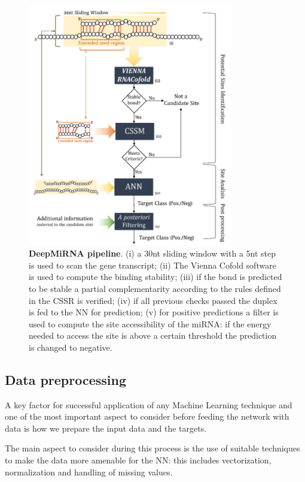 \begin{figure}[hbt!]
	\centering
	\includegraphics[width=0.8\textwidth]{Figures/pipeline}
	\caption{\textbf{DeepMiRNA pipeline}. (i) a 30nt sliding window with a 5nt step is used to scan the gene transcript; (ii) The Vienna Cofold software is used to compute the binding stability; (iii) if the bond is predicted to be stable a partial complementarity according to the rules defined in the CSSR is verified; (iv) if all previous checks passed the duplex is fed to the NN for prediction; (v) for positive predictions a filter is used to compute the site accessibility of the miRNA: if the energy needed to access the site is above a certain threshold the prediction is changed to negative.}
	\label{fig:pipeline}
\end{figure}

\subsection{Data preprocessing}
A key factor for successful application of any Machine Learning technique and one of the most important aspect to consider before feeding the network with data is how we prepare the input data and the targets.  

The main aspect to consider during this process is the use of suitable techniques to make the data more amenable for the NN: this includes vectorization, normalization and handling of missing values. 
	


